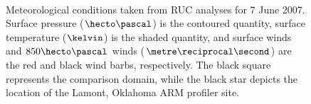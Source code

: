 \begin{figure}[H]
     \begin{center}
%
        \\ %
%
    \end{center}
    \caption{%
        Meteorological conditions taken from RUC analyses for 7 June 2007. Surface pressure ($\hecto\pascal$) is the contoured quantity, surface temperature ($\kelvin$) is the shaded quantity, and surface winds and $850\hecto\pascal$ winds ($\metre\reciprocal\second$) are the red and black wind barbs, respectively. The black square represents the comparison domain, while the black star depicts the location of the Lamont, Oklahoma ARM profiler site.}%
   \label{figure402}
\end{figure}


